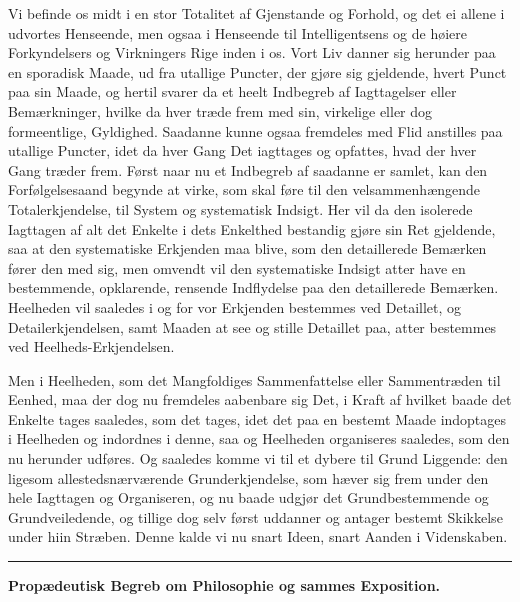 \documentclass[12pt,a4paper]{book}
\newcommand{\grouphead}[1]{%
  \bigskip\begin{center}\large\textbf{#1}\end{center}\smallskip}
\newcommand{\apage}[1]{\marginnote{\footnotesize\textit{[#1]}}}
\begin{document}
Vi befinde os midt i en stor Totalitet af Gjenstande og Forhold, og det ei allene
i udvortes Henseende, men ogsaa i Henseende til Intelligentsens og de høiere
Forkyndelsers og Virkningers Rige inden i os. Vort Liv danner sig herunder paa en
sporadisk Maade, ud fra utallige Puncter, der gjøre sig gjeldende, hvert Punct
paa sin Maade, og hertil svarer da et heelt Indbegreb af Iagttagelser eller
Bemærkninger, hvilke da hver træde frem med sin, virkelige eller dog
formeentlige, Gyldighed. Saadanne kunne ogsaa fremdeles med Flid anstilles paa
utallige Puncter, idet da hver Gang Det iagttages og opfattes, hvad der hver Gang
træder frem. Først naar nu et Indbegreb af saadanne er samlet, kan den
Forfølgelsesaand begynde at virke, som skal føre til den velsammenhængende
Totalerkjendelse, til System og systematisk Indsigt. Her vil da den isolerede
Iagttagen af  \apage{24} alt det Enkelte i dets Enkelthed bestandig gjøre sin Ret gjeldende,
saa at den systematiske Erkjenden maa blive, som den detaillerede Bemærken fører
den med sig, men omvendt vil den systematiske Indsigt atter have en bestemmende,
opklarende, rensende Indflydelse paa den detaillerede Bemærken. Heelheden vil
saaledes i og for vor Erkjenden bestemmes ved Detaillet, og Detailerkjendelsen,
samt Maaden at see og stille Detaillet paa, atter bestemmes ved
Heelheds-Erkjendelsen.

Men i Heelheden, som det Mangfoldiges Sammenfattelse eller Sammentræden til
Eenhed, maa der dog nu fremdeles aabenbare sig Det, i Kraft af hvilket baade det
Enkelte tages saaledes, som det tages, idet det paa en bestemt Maade indoptages i
Heelheden og indordnes i denne, saa og Heelheden organiseres saaledes, som den nu
herunder udføres. Og saaledes komme vi til et dybere til Grund Liggende: den
ligesom allestedsnærværende Grunderkjendelse, som hæver sig frem under den hele
Iagttagen og Organiseren, og nu baade udgjør det Grundbestemmende og
Grundveiledende, og tillige dog selv først uddanner og antager bestemt Skikkelse
under hiin Stræben. Denne kalde vi nu snart Ideen, snart Aanden i Videnskaben.

\begin{center}\rule{0.18\linewidth}{0.4pt}\end{center}

\grouphead{Propædeutisk Begreb om Philosophie og sammes Exposition.}
\end{document}
